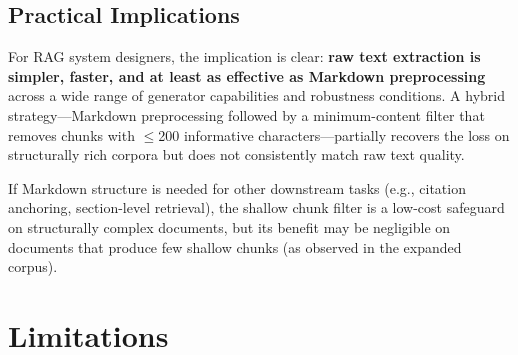 \documentclass{article}
\begin{document}
\subsection{Practical Implications}

For RAG system designers, the implication is clear: \textbf{raw text extraction is simpler, faster, and at least as effective as Markdown preprocessing} across a wide range of generator capabilities and robustness conditions. A hybrid strategy---Markdown preprocessing followed by a minimum-content filter that removes chunks with $\leq$200 informative characters---partially recovers the loss on structurally rich corpora but does not consistently match raw text quality.

If Markdown structure is needed for other downstream tasks (e.g., citation anchoring, section-level retrieval), the shallow chunk filter is a low-cost safeguard on structurally complex documents, but its benefit may be negligible on documents that produce few shallow chunks (as observed in the expanded corpus).

\section{Limitations}
\end{document}
